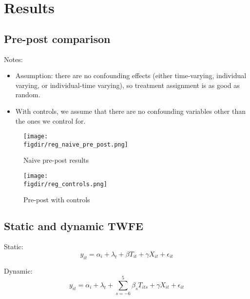 
\section{Results}%
\label{sec:results}


\subsection{Pre-post comparison}%
\label{sub:pre_post}

Notes:
\begin{itemize}
    \item Assumption: there are no confounding effects (either time-varying,
        individual varying, or individual-time varying), so treatment
        assignment is as good as random.

    \item With controls, we assume that there are no confounding variables
        other than the ones we control for.
\end{itemize}

\begin{figure}[htpb]
    \centering
    \caption{Naive pre-post results}%
    \texttt{[image: \\figdir/reg\_naive\_pre\_post.png]}
    \label{fig:reg_naive_pre_post}
\end{figure}

\begin{figure}[htpb]
    \centering
    \caption{Pre-post with controls}%
    \texttt{[image: \\figdir/reg\_controls.png]}
    \label{fig:reg_controls}
\end{figure}


\subsection{Static and dynamic TWFE}%
\label{sub:static_twfe}

Static:
\begin{equation}
    y_{it} = \alpha_i + \lambda_t + \beta T_{it} + \gamma X_{it} + \epsilon_{it}
\end{equation}

Dynamic:
\begin{equation}
    y_{it} = \alpha_i + \lambda_t + \sum^{5}_{s=-6} \beta_s T_{its} + \gamma X_{it} + \epsilon_{it}
\end{equation}

